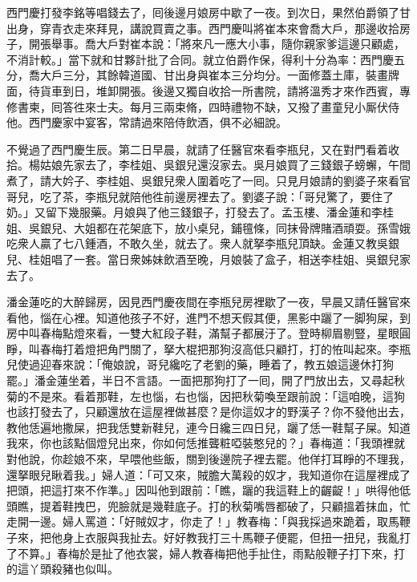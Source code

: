 西門慶打發李銘等唱錢去了，囘後邊月娘房中歇了一夜。到次日，果然伯爵領了甘出身，穿青衣走來拜見，講說買賣之事。西門慶叫將崔本來會喬大戶，那邊收拾房子，開張舉事。喬大戶對崔本說：「將來凡一應大小事，隨你親家爹這邊只顧處，不消計較。」當下就和甘夥計批了合同。就立伯爵作保，得利十分為率：西門慶五分，喬大戶三分，其餘韓道國、甘出身與崔本三分均分。一面修蓋土庫，裝畫牌面，待貨車到日，堆卸開張。後邊又獨自收拾一所書院，請將溫秀才來作西賓，專修書柬，囘答徃來士夫。每月三兩束脩，四時禮物不缺，又撥了畫童兒小厮伏侍他。{}西門慶家中宴客，常請過來陪侍飲酒，俱不必細說。

不覺過了西門慶生辰。第二日早晨，就請了任醫官來看李瓶兒，又在對門看着收拾。楊姑娘先家去了，李桂姐、吳銀兒還沒家去。吳月娘買了三錢銀子螃蠏，午間煮了，請大妗子、李桂姐、吳銀兒衆人圍着吃了一囘。只見月娘請的劉婆子來看官哥兒，吃了茶，李瓶兒就陪他徃前邊房裡去了。劉婆子說：「哥兒驚了，要住了奶。」又留下幾服藥。月娘與了他三錢銀子，打發去了。孟玉樓、潘金蓮和李桂姐、吳銀兒、大姐都在花架底下，放小桌兒，鋪氊條，同抹骨牌賭酒頑耍。孫雪娥吃衆人贏了七八鍾酒，不敢久坐，就去了。衆人就拏李瓶兒頂缺。金蓮又教吳銀兒、桂姐唱了一套。當日衆姊妹飲酒至晚，月娘裝了盒子，相送李桂姐、吳銀兒家去了。

潘金蓮吃的大醉歸房，因見西門慶夜間在李瓶兒房裡歇了一夜，早晨又請任醫官來看他，惱在心裡。知道他孩子不好，進門不想天假其便，黑影中躧了一脚狗屎，到房中叫春梅點燈來看，一雙大紅段子鞋，滿幫子都展汙了。登時柳眉剔豎，星眼圓睜，叫春梅打着燈把角門關了，拏大棍把那狗沒高低只顧打，打的恠叫起來。李瓶兒使過迎春來說：「俺娘說，哥兒纔吃了老劉的藥，睡着了，教五娘這邊休打狗罷。」潘金蓮坐着，半日不言語。一面把那狗打了一囘，開了門放出去，又尋起秋菊的不是來。看着那鞋，左也惱，右也惱，因把秋菊喚至跟前說：「這咱晚，這狗也該打發去了，只顧還放在這屋裡做甚麼？是你這奴才的野漢子？你不發他出去，教他恁遍地撒屎，{}把我恁雙新鞋兒，連今日纔三四日兒，躧了恁一鞋幫子屎。知道我來，你也該點個燈兒出來，你如何恁推聾粧啞裝憨兒的？」春梅道：「我頭裡就對他說，你趁娘不來，早喂他些飯，關到後邊院子裡去罷。他佯打耳睜的不理我，還拏眼兒瞅着我。」婦人道：「可又來，賊膽大萬殺的奴才，我知道你在這屋裡成了把頭，把這打來不作準。」因叫他到跟前：「瞧，躧的我這鞋上的齷齪！」哄得他低頭瞧，提着鞋拽巴，兜臉就是幾鞋底子。打的秋菊嘴唇都破了，只顧搵着抹血，忙走開一邊。婦人罵道：「好賊奴才，你走了！」教春梅：「與我採過來跪着，取馬鞭子來，把他身上衣服與我扯去。好好教我打三十馬鞭子便罷，但扭一扭兒，我亂打了不算。」春梅於是扯了他衣裳，婦人教春梅把他手扯住，雨點般鞭子打下來，打的這丫頭殺豬也似叫。

